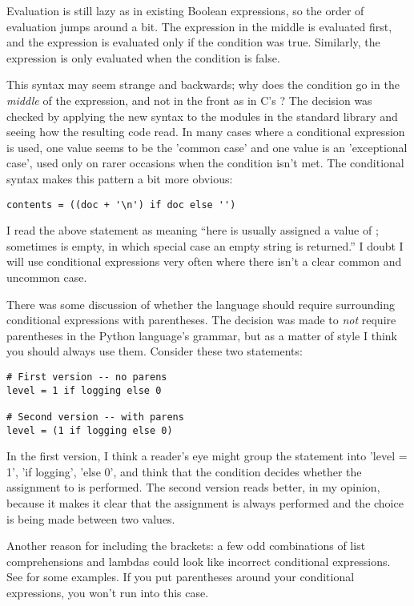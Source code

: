 \documentclass{howto}
\begin{document}
Evaluation is still lazy as in existing Boolean expressions, so the
order of evaluation jumps around a bit.  The 
expression in the middle is evaluated first, and the 
expression is evaluated only if the condition was true.  Similarly,
the  expression is only evaluated when the condition
is false.

This syntax may seem strange and backwards; why does the condition go
in the \emph{middle} of the expression, and not in the front as in C's
?  The decision was checked by applying the new syntax
to the modules in the standard library and seeing how the resulting
code read.  In many cases where a conditional expression is used, one
value seems to be the 'common case' and one value is an 'exceptional
case', used only on rarer occasions when the condition isn't met.  The
conditional syntax makes this pattern a bit more obvious:

\begin{verbatim}
contents = ((doc + '\n') if doc else '')
\end{verbatim}

I read the above statement as meaning ``here  is 
usually assigned a value of ; sometimes 
 is empty, in which special case an empty string is returned.''  
I doubt I will use conditional expressions very often where there 
isn't a clear common and uncommon case.

There was some discussion of whether the language should require
surrounding conditional expressions with parentheses.  The decision
was made to \emph{not} require parentheses in the Python language's
grammar, but as a matter of style I think you should always use them.
Consider these two statements:

\begin{verbatim}
# First version -- no parens
level = 1 if logging else 0

# Second version -- with parens
level = (1 if logging else 0)
\end{verbatim}

In the first version, I think a reader's eye might group the statement
into 'level = 1', 'if logging', 'else 0', and think that the condition
decides whether the assignment to  is performed.  The
second version reads better, in my opinion, because it makes it clear
that the assignment is always performed and the choice is being made
between two values.

Another reason for including the brackets: a few odd combinations of
list comprehensions and lambdas could look like incorrect conditional
expressions. See  for some examples.  If you put parentheses
around your conditional expressions, you won't run into this case.
\end{document}

